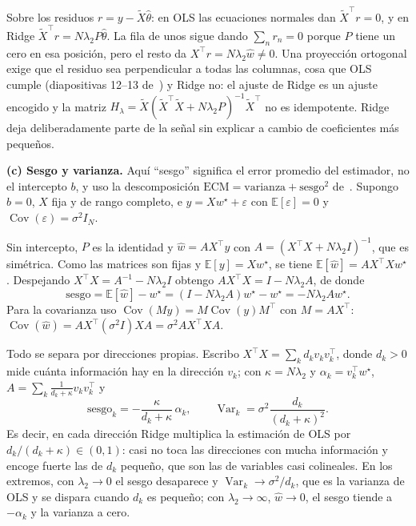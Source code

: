 \documentclass[10pt,a4paper]{article}
\newcommand{\Xt}{\tilde X}
\newcommand{\E}{\mathbb E}
\DeclareMathOperator{\Cov}{Cov}
\begin{document}
Sobre los residuos $r=y-\Xt\hat\theta$: en OLS las ecuaciones normales dan $\Xt^\top r=0$, y en Ridge $\Xt^\top r=N\lambda_2P\hat\theta$. La fila de unos sigue dando $\sum_nr_n=0$ porque $P$ tiene un cero en esa posición, pero el resto da $X^\top r=N\lambda_2\hat w\neq0$. Una proyección ortogonal exige que el residuo sea perpendicular a todas las columnas, cosa que OLS cumple (diapositivas 12--13 de~\cite{clase5}) y Ridge no: el ajuste de Ridge es un ajuste encogido y la matriz $H_\lambda=\Xt(\Xt^\top\Xt+N\lambda_2P)^{-1}\Xt^\top$ no es idempotente. Ridge deja deliberadamente parte de la señal sin explicar a cambio de coeficientes más pequeños.

\textbf{(c) Sesgo y varianza.} Aquí ``sesgo'' significa el error promedio del estimador, no el intercepto $b$, y uso la descomposición $\text{ECM}=\text{varianza}+\text{sesgo}^2$ de~\cite[secc.~4.7.6]{pml1}. Supongo $b=0$, $X$ fija y de rango completo, e $y=Xw^\star+\varepsilon$ con $\E[\varepsilon]=0$ y $\Cov(\varepsilon)=\sigma^2I_N$.

Sin intercepto, $P$ es la identidad y $\hat w=AX^\top y$ con $A=(X^\top X+N\lambda_2I)^{-1}$, que es simétrica. Como las matrices son fijas y $\E[y]=Xw^\star$, se tiene $\E[\hat w]=AX^\top Xw^\star$. Despejando $X^\top X=A^{-1}-N\lambda_2I$ obtengo $AX^\top X=I-N\lambda_2A$, de donde
\[ \text{sesgo}=\E[\hat w]-w^\star=(I-N\lambda_2A)w^\star-w^\star=-N\lambda_2Aw^\star . \]
Para la covarianza uso $\Cov(My)=M\Cov(y)M^\top$ con $M=AX^\top$: $\Cov(\hat w)=AX^\top(\sigma^2I)XA=\sigma^2AX^\top XA$.

Todo se separa por direcciones propias. Escribo $X^\top X=\sum_kd_kv_kv_k^\top$, donde $d_k>0$ mide cuánta información hay en la dirección $v_k$; con $\kappa=N\lambda_2$ y $\alpha_k=v_k^\top w^\star$, $A=\sum_k\frac{1}{d_k+\kappa}v_kv_k^\top$ y
\[ \text{sesgo}_k=-\frac{\kappa}{d_k+\kappa}\,\alpha_k,\qquad \operatorname{Var}_k=\sigma^2\frac{d_k}{(d_k+\kappa)^2}. \]
Es decir, en cada dirección Ridge multiplica la estimación de OLS por $d_k/(d_k+\kappa)\in(0,1)$: casi no toca las direcciones con mucha información y encoge fuerte las de $d_k$ pequeño, que son las de variables casi colineales. En los extremos, con $\lambda_2\to0$ el sesgo desaparece y $\operatorname{Var}_k\to\sigma^2/d_k$, que es la varianza de OLS y se dispara cuando $d_k$ es pequeño; con $\lambda_2\to\infty$, $\hat w\to0$, el sesgo tiende a $-\alpha_k$ y la varianza a cero.
\end{document}
